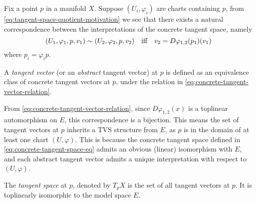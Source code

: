\documentclass[../main-manifolds.tex]{subfiles}
\begin{document}
Fix a point $p$ in a manifold $X$. Suppose $(U_i,\varphi_i)$ are charts containing $p$, from \cref{eq:tangent-space-quotient-motivation} we see that there exists a natural correspondence between the interpretations of the concrete tangent space, namely 
\begin{equation}\label{eq:concrete-tangent-vector-relation}
    (U_1,\varphi_1,p,v_1)\sim (U_2,\varphi_2,p,v_2)\qqtext{iff} v_2 = D\varphi_{1,2}(p_1)(v_1)
\end{equation}
where $p_i = \varphi_i p$. 
\begin{definition}
    A \emph{tangent vector} (or an \emph{abstract} tangent vector) at $p$ is defined as an equivalence class of concrete tangent vectors at $p$, under the relation in \cref{eq:concrete-tangent-vector-relation}.
\end{definition}

From \cref{eq:concrete-tangent-vector-relation}, since $D\varphi_{1,2}(x)$ is a toplinear automorphism on $E$, this correspondence is a bijection. This means the set of tangent vectors at $p$ inherits a TVS structure from $E$, as $p$ is in the domain of at least one chart $(U,\varphi)$. This is because the concrete tangent space defined in \cref{eq:concrete-tangent-space-eq} admits an obvious (linear) isomorphism with $E$, and each abstract tangent vector admits a unique interpretation with respect to $(U,\varphi)$.

\begin{definition}
    The \emph{tangent space} at $p$, denoted by $T_p X$ is the set of all tangent vectors at $p$. It is toplinearly isomorphic to the model space $E$.
\end{definition}
\end{document}
